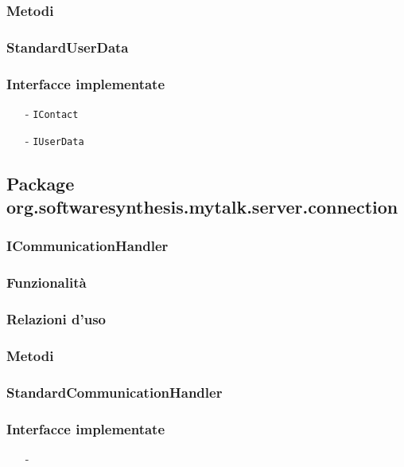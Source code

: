 \subsubsection*{Metodi}

\subsubsection{StandardUserData}\label{sec:standarduserdata}
\subsubsection*{Interfacce implementate}
\begin{itemize}[noitemsep,nolistsep]
  \item[-] \texttt{IContact}
  \item[-] \texttt{IUserData}
\end{itemize}

\subsection{Package org.softwaresynthesis.mytalk.server.connection}\label{sec:connection}

\subsubsection{ICommunicationHandler}\label{sec:icommunicationhandler}

\subsubsection*{Funzionalità}

\subsubsection*{Relazioni d'uso}


\subsubsection*{Metodi}

\subsubsection{StandardCommunicationHandler}\label{sec:standardcommunicationhandler}

\subsubsection*{Interfacce implementate}
\begin{itemize}[noitemsep,nolistsep]
  \item[-]
\end{itemize}


